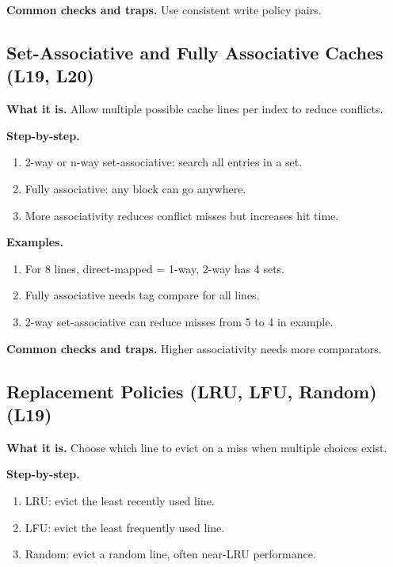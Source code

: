 \documentclass[11pt]{article}
\begin{document}
\textbf{Common checks and traps.} Use consistent write policy pairs.

\subsection{Set-Associative and Fully Associative Caches (L19, L20)}
\textbf{What it is.} Allow multiple possible cache lines per index to reduce conflicts.

\textbf{Step-by-step.}
\begin{enumerate}[leftmargin=*]
  \item 2-way or n-way set-associative: search all entries in a set.
  \item Fully associative: any block can go anywhere.
  \item More associativity reduces conflict misses but increases hit time.
\end{enumerate}

\textbf{Examples.}
\begin{enumerate}[leftmargin=*]
  \item For 8 lines, direct-mapped = 1-way, 2-way has 4 sets.
  \item Fully associative needs tag compare for all lines.
  \item 2-way set-associative can reduce misses from 5 to 4 in example.
\end{enumerate}

\textbf{Common checks and traps.} Higher associativity needs more comparators.

\begin{figure}[h]
\centering
{}
\end{figure}

\subsection{Replacement Policies (LRU, LFU, Random) (L19)}
\textbf{What it is.} Choose which line to evict on a miss when multiple choices exist.

\textbf{Step-by-step.}
\begin{enumerate}[leftmargin=*]
  \item LRU: evict the least recently used line.
  \item LFU: evict the least frequently used line.
  \item Random: evict a random line, often near-LRU performance.
\end{enumerate}
\end{document}
